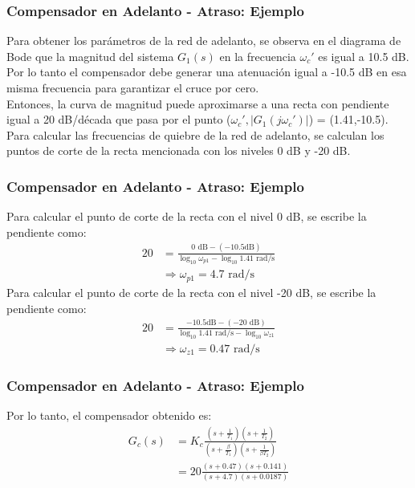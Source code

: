 \documentclass[aspectratio=169, handout]{beamer}
\theoremstyle{definition}
\theoremstyle{plain}
\theoremstyle{remark}
\begin{document}
\begin{frame}[<+->]\frametitle{Compensador en Adelanto - Atraso: Ejemplo}
	Para obtener los parámetros de la red de adelanto, se observa en el diagrama de Bode que la magnitud del sistema $G_1(s)$ en la frecuencia $\omega_c'$ es igual a 10.5 dB.\\
	\vspace*{2mm}
	Por lo tanto el compensador debe generar una atenuación igual a -10.5 dB en esa misma frecuencia para garantizar el cruce por cero.\\
	\vspace*{2mm}
	Entonces, la curva de magnitud puede aproximarse a una recta con pendiente igual a 20 dB/década que pasa por el punto ($\omega_c',|G_1(j\omega_c')|$) = (1.41,-10.5).\\
	\vspace*{2mm}
	Para calcular las frecuencias de quiebre de la red de adelanto, se calculan los puntos de corte de la recta mencionada con los niveles 0 dB y -20 dB.
\end{frame}

\begin{frame}[<+->]\frametitle{Compensador en Adelanto - Atraso: Ejemplo}
	Para calcular el punto de corte de la recta con el nivel 0 dB, se escribe la pendiente como:
	\begin{align*}
		20 &= \frac{0 \text{ dB} - (-10.5 \text{dB})}{\log_{10}\omega_{p1} - \log_{10}1.41 \text{ rad/s}}\\
		& \Rightarrow \omega_{p1} = 4.7 \text{ rad/s}
	\end{align*}
	Para calcular el punto de corte de la recta con el nivel -20 dB, se escribe la pendiente como:
	\begin{align*}
		20 &= \frac{-10.5 \text{dB} - (-20 \text{ dB})}{\log_{10}1.41 \text{ rad/s} - \log_{10}\omega_{z1} }\\
		& \Rightarrow \omega_{z1} = 0.47 \text{ rad/s}
	\end{align*}
\end{frame}

\begin{frame}[<+->]\frametitle{Compensador en Adelanto - Atraso: Ejemplo}
	Por lo tanto, el compensador obtenido es:
	\begin{align*}
		G_c(s) &= K_c \frac{\left(s+\frac{1}{T_1}\right)\left(s+\frac{1}{T_2}\right)}{\left(s+\frac{\beta}{T_1}\right)\left(s+\frac{1}{\beta T_2}\right)}\\
		 &= 20 \frac{(s+0.47)(s+0.141)}{(s+4.7)(s+0.0187)}
	\end{align*}
\end{frame}
\end{document}
